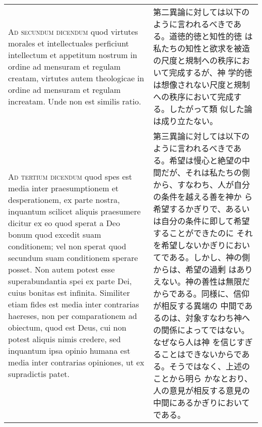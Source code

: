 \documentclass[10pt]{jsarticle}
\begin{document}
\begin{longtable}{p{21em}p{21em}}
\\


{\scshape Ad secundum dicendum} quod virtutes morales et
intellectuales perficiunt intellectum et appetitum nostrum in ordine
ad mensuram et regulam creatam, virtutes autem theologicae in ordine
ad mensuram et regulam increatam. Unde non est similis ratio.
 
&

 第二異論に対しては以下のように言われるべきである。道徳的徳と知性的徳
 は私たちの知性と欲求を被造の尺度と規制への秩序において完成するが、神
 学的徳は想像されない尺度と規制への秩序において完成する。したがって類
 似した論は成り立たない。

\\

{\scshape Ad tertium dicendum} quod spes est media inter
praesumptionem et desperationem, ex parte nostra, inquantum scilicet
aliquis praesumere dicitur ex eo quod sperat a Deo bonum quod excedit
suam conditionem; vel non sperat quod secundum suam conditionem
sperare posset. Non autem potest esse superabundantia spei ex parte
Dei, cuius bonitas est infinita. Similiter etiam fides est media inter
contrarias haereses, non per comparationem ad obiectum, quod est Deus,
cui non potest aliquis nimis credere, sed inquantum ipsa opinio humana
est media inter contrarias opiniones, ut ex supradictis patet.

 &

第三異論に対しては以下のように言われるべきである。希望は慢心と絶望の中
間だが、それは私たちの側から、すなわち、人が自分の条件を越える善を神か
ら希望するかぎりで、あるいは自分の条件に即して希望することができたのに
それを希望しないかぎりにおいてである。しかし、神の側からは、希望の過剰
はありえない。神の善性は無限だからである。同様に、信仰が相反する異端の
中間であるのは、対象すなわち神への関係によってではない。なぜなら人は神
を信じすぎることはできないからである。そうではなく、上述のことから明ら
かなとおり、人の意見が相反する意見の中間にあるかぎりにおいてである。
 
\end{longtable}
\end{document}
